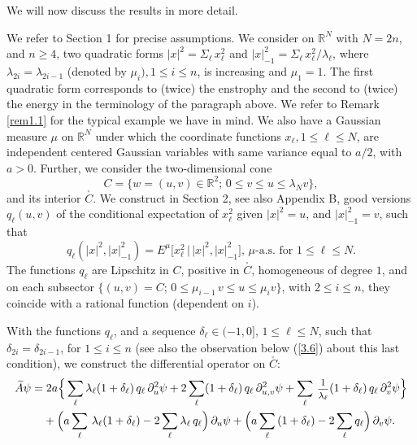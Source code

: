 \documentclass[12pt,leqno]{article}
\def\IR{{\mathbb R}}
\def\dis{\displaystyle}
\def\f{\footnotesize}
\def\wt{\widetilde}
\begin{document}
\medskip
We will now discuss the results in more detail.

\medskip
We refer to Section 1 for precise assumptions. We consider on $\IR^N$ with $N = 2n$, and $n \ge 4$, two quadratic forms $|x|^2 = \Sigma_\ell \,x_\ell^2$ and $|x|^2_{-1} = \Sigma_\ell \, x_\ell^2/\lambda_\ell$, where $\lambda_{2i} = \lambda_{2i-1}$ (denoted by $\mu_i), 1 \le i \le n$, is increasing and $\mu_1 = 1$. The first quadratic form corresponds to (twice) the enstrophy and the second to (twice) the energy in the terminology of the paragraph above. We refer to Remark \ref{rem1.1} for the typical example we have in mind. We also have a Gaussian measure $\mu$ on $\IR^N$ under which the coordinate functions $x_\ell, 1 \le \ell \le N$, are independent centered Gaussian variables with same variance equal to $a/2$, with $a > 0$. Further, we consider the two-dimensional cone
\begin{equation}\label{0.1}
C = \{w = (u,v) \in \IR^2; \,0 \le v \le u\le \lambda_N v\},
\end{equation}
and its interior $\stackrel{_\circ}{C}$. We construct in Section 2, see also Appendix B, good versions $q_\ell(u,v)$ of the conditional expectation of $x^2_\ell$ given $|x|^2 = u$, and $|x|^2_{-1} = v$, such that
\begin{equation}\label{0.2}
q_\ell (|x|^2, |x|^2_{-1}) = E^\mu\big[x_\ell^2\,\big| \,|x|^2, |x|^2_{-1}\big], \, \mbox{$\mu$-a.s. for $1 \le \ell \le N$}.
\end{equation}
The functions $q_\ell$ are Lipschitz in $C$, positive in $\stackrel{_\circ}{C}$, homogeneous of degree $1$, and on each subsector $\{(u,v) = C$; $0 \le \mu_{i-1} \,v \le u \le \mu_i v\}$, with $2 \le i \le n$, they coincide with a rational function (dependent on $i$).

\medskip
With the functions $q_\ell$, and a sequence $\delta_\ell \in (-1,0]$, $1 \le \ell \le N$, such that $\delta_{2i} = \delta_{2i-1}$, for $1 \le i \le n$ (see also the observation below (\ref{3.6}) about this last condition), we construct the differential operator on $\stackrel{_\circ}{C}$:
\begin{equation}\label{0.3}
\begin{split}
\wt{A} \psi  = &\; 2a\Big\{\dis\sum_\ell \lambda_\ell ( 1 + \delta_\ell) \, q_\ell \,\partial^2_u \psi + 2 \dis\sum_\ell (1 + \delta_\ell) \,q_\ell\,\partial^2_{u,v} \psi + \dis\sum_\ell \, \mbox{\f $\dis\frac{1}{\lambda_\ell}$} (1 + \delta_\ell) \,q_\ell \,\partial_v^2 \psi\Big\}
\\
& + \Big(a \dis\sum_\ell \,\lambda_\ell (1 + \delta_\ell) - 2 \dis\sum_\ell \lambda_\ell \, q_\ell\Big) \, \partial_u \psi +  \Big(a \dis\sum_\ell \,(1 + \delta_\ell) - 2 \dis\sum_\ell q_\ell\Big) \, \partial_v\psi .
\end{split}
\end{equation}
\end{document}
